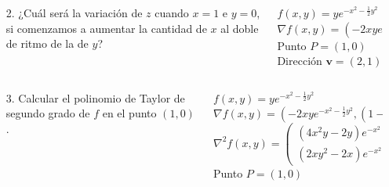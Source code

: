 \documentclass[aspectratio=169,10pt,t]{beamer}
\begin{document}
\begin{frame}
\begin{columns}
\begin{column}[T]{0.53\textwidth}
\begin{enumerate}
  \item[2.] ¿Cuál será la variación de $z$ cuando $x=1$ e $y=0$, si comenzamos a aumentar la cantidad de $x$ al doble de ritmo de la de $y$?
\end{enumerate}
\end{column}
\begin{column}[T]{0.47\textwidth}
\begin{datos}
$f(x,y)=ye^{-x^2-\frac{1}{2}y^2}$\\
$\nabla f(x,y)=\left(-2xye^{-x^2-\frac{1}{2}y^2}, (1-y^2)e^{-x^2-\frac{1}{2}y^2}\right)$\\
Punto $P=(1,0)$\\
Dirección $\mathbf{v}=(2,1)$
\end{datos}
\end{column}
\end{columns}
\end{frame}


\begin{frame}
\begin{columns}
\begin{column}[T]{0.42\textwidth}
\begin{enumerate}
  \item[3.] Calcular el polinomio de Taylor de segundo grado de $f$ en el punto $(1,0)$.
\end{enumerate}
\end{column}
\begin{column}[T]{0.61\textwidth}
\begin{datos}
$f(x,y)=ye^{-x^2-\frac{1}{2}y^2}$\\
$\nabla f(x,y)=\left(-2xye^{-x^2-\frac{1}{2}y^2}, (1-y^2)e^{-x^2-\frac{1}{2}y^2}\right)$\\
$\nabla^2f(x,y)=\left(
\begin{array}{cc}
  (4x^2y-2y)e^{-x^2-\frac{1}{2}y^2} & (2xy^2-2x)e^{-x^2-\frac{1}{2}y^2}\\
  (2xy^2-2x)e^{-x^2-\frac{1}{2}y^2} & (y^3-3y)e^{-x^2-\frac{1}{2}y^2}
\end{array}
\right)$\\
Punto $P=(1,0)$
\end{datos}
\end{column}
\end{columns}
\end{frame}
\end{document}

